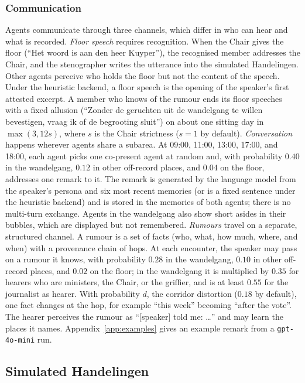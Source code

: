 \documentclass[sigconf,review,anonymous]{acmart}
\begin{document}
\subsubsection{Communication}
\label{sec:communication}
Agents communicate through three channels,
which differ in who can hear and what is recorded. \emph{Floor speech}
requires recognition. When the Chair gives the floor (``Het woord is aan
den heer Kuyper''), the recognised member addresses the Chair, and the
stenographer writes the utterance into the simulated Handelingen. Other
agents perceive who holds the floor but not the content of the speech.
Under the heuristic backend, a floor speech is the opening of the
speaker's first attested excerpt. A member who knows of the rumour ends
its floor speeches with a fixed allusion (``Zonder de geruchten uit de
wandelgang te willen bevestigen, vraag ik of de begrooting sluit'') on
about one sitting day in $\max(3,12s)$, where $s$ is the Chair strictness
($s=1$ by default).
\emph{Conversation} happens wherever agents share a subarea. At 09:00,
11:00, 13:00, 17:00, and 18:00, each agent picks one co-present agent at
random and, with probability $0.40$ in the wandelgang, $0.12$ in other
off-record places, and $0.04$ on the floor, addresses one remark to it.
The remark is generated by the language model from the speaker's persona
and six most recent memories (or is a fixed sentence under the heuristic
backend) and is stored in the memories of both agents; there is no
multi-turn exchange. Agents in the wandelgang also show short asides in
their bubbles, which are displayed but not remembered. \emph{Rumours}
travel on a separate, structured channel. A rumour is a set of facts (who,
what, how much, where, and when) with a provenance chain of hops. At each
encounter, the speaker may pass on a rumour it knows, with probability
$0.28$ in the wandelgang, $0.10$ in other off-record places, and $0.02$ on
the floor; in the wandelgang it is multiplied by $0.35$ for hearers who
are ministers, the Chair, or the griffier, and is at least $0.55$ for the
journalist as hearer. With probability $d$, the corridor distortion ($0.18$ by
default), one fact changes at the hop, for example ``this week'' becoming
``after the vote''. The hearer perceives the rumour as ``[speaker] told
me: \ldots'' and may learn the places it names.
Appendix~\ref{app:examples} gives an example remark from a
\texttt{gpt-4o-mini} run.

\subsection{Simulated Handelingen}
\label{sec:calibration}
\end{document}

